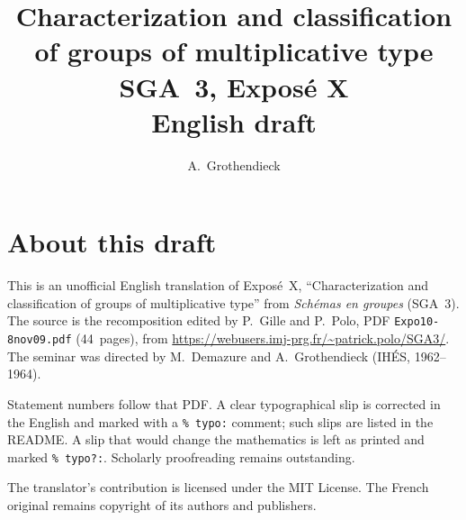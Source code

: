 \documentclass[11pt,a4paper,oneside]{amsbook}
\title[SGA~3, Expos\'e X (English draft)]{Characterization and classification of groups of multiplicative type\\
{\normalsize SGA~3, Expos\'e X\\English draft}}
\author{A.\ Grothendieck}
\date{}
\begin{document}
\frontmatter
\maketitle

\chapter*{About this draft}
This is an unofficial English translation of Expos\'e~X, ``Characterization and classification of groups of multiplicative type''
from \textit{Sch\'emas en groupes} (SGA~3).
The source is the recomposition edited by P.~Gille and P.~Polo,
PDF \texttt{Expo10-8nov09.pdf} (44~pages),
from \url{https://webusers.imj-prg.fr/~patrick.polo/SGA3/}.
The seminar was directed by M.~Demazure and A.~Grothendieck
(IH\'ES, 1962--1964).

Statement numbers follow that PDF. A clear typographical slip is
corrected in the English and marked with a \texttt{\% typo:} comment;
such slips are listed in the README. A slip that would change the
mathematics is left as printed and marked \texttt{\% typo?:}.
Scholarly proofreading remains outstanding.

The translator's contribution is licensed under the MIT License.
The French original remains copyright of its authors and publishers.

\tableofcontents
\mainmatter








\end{document}
